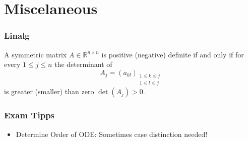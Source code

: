 \part{Miscelaneous}
\setcounter{section}{0}

\section{Linalg}

A symmetric matrix $A\in\mathbb{R}^{n \times n}$ is positive (negative) definite if and only if for every $1 \le j \le n$ the determinant of $$A_j = (a_{kl})_{\substack{1\le k \le j\\ 1\le l \le j}}$$ is greater (smaller) than zero $\det(A_j) >0$.

\section{Exam Tipps}
\begin{itemize}
	\item Determine Order of ODE: Sometimes case distinction needed!
\end{itemize}